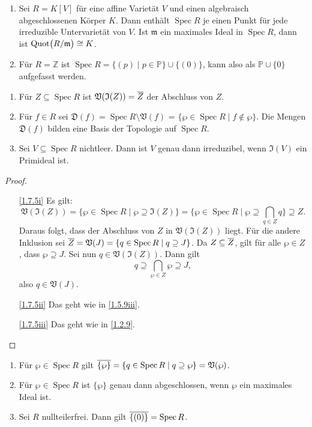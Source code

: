 \documentclass[a4paper,12pt,index=toc]{scrbook}
\theoremstyle{keinenummern} %
\def\V{\mathfrak{V}}
\def\I{\mathfrak{I}}
\def\P{\mathbb{P}}
\newcommand{\D}{\mathfrak{D}}
\def\m{\mathfrak{m}}
\newcommand{\Spec}{\operatorname{Spec}}
\newcommand{\Quot}{\operatorname{Quot}}
\newcommand{\set}[1]{\ensuremath{\mathbb{#1}}}
\newcommand{\Z}{\set{Z}}
\def\Bar#1{\ensuremath\overline{#1}}
\begin{document}
\begin{bsp}\label{1.7.4}
  \begin{enumerate}
  \item{} Sei $R=K[V]$ für eine affine Varietät $V$ und einen algebraisch abgeschlossenen Körper $K$. Dann enthält
    $\Spec R$ je einen Punkt für jede irreduzible Untervarietät von $V$. Ist $\m$ ein maximales Ideal in $\Spec R$, dann ist
    $\Quot\bigl(\Quotient{R}{\m}\bigr)\cong K$.
  \item{} Für $R=\Z$ ist $\Spec R = \{(p)\mid p\in\P\}\cup\{(0)\}$, kann also als $\P\cup\{0\}$ aufgefasst werden.
  \end{enumerate}
\end{bsp}

\begin{bem}\label{1.7.5}
  \begin{enumerate}
  \item{} Für $Z\subseteq\Spec R$ ist $\V(\I(Z))=\Bar{Z}$ der Abschluss von $Z$.
  \item{} Für $f\in R$ sei $\D(f)=\Spec R\setminus\V(f)$ = $\{\wp\in\Spec R\mid f\notin \wp\}$. Die Mengen $\D(f)$
    bilden eine Basis der Topologie auf $\Spec R$.
  \item{} Sei $V\subseteq\Spec R$ nichtleer. Dann ist $V$ genau dann irreduzibel, wenn $\I(V)$ ein Primideal ist.
  \end{enumerate}
\end{bem}
\begin{proof}
  \begin{enumerate}
  \item[\ref{1.7.5i}] Es gilt:\vspace*{-6pt}
  \[\V(\I(Z))=\{\wp\in\Spec R\mid \wp\supseteq\I(Z)\} = \{\wp\in\Spec R\mid \wp\supseteq\bigcap_{q\in Z}q\}\supseteq Z.\]
    Daraus folgt, dass der Abschluss von $Z$ in $\V(\I(Z))$ liegt. Für die andere Inklusion sei
    $\Bar{Z}=\V(J)=\{q\in\Spec R\mid q\supseteq J\}$. Da $Z\subseteq\Bar{Z}$, gilt für alle $\wp\in Z$, dass $\wp\supseteq J$. Sei
    nun $q\in\V(\I(Z))$. Dann gilt \[q\supseteq\bigcap_{\wp\in Z}\wp\supseteq J,\] also $q\in\V(J)$.
  \item[\ref{1.7.5ii}] Das geht wie in \cref{1.5.9iii}.
  \item[\ref{1.7.5iii}] Das geht wie in \cref{1.2.9}.
  \end{enumerate}
\end{proof}

\begin{bem}\label{1.7.6}
  \begin{enumerate}
  \item{} Für $\wp\in\Spec R$ gilt $\Bar{\{\wp\}}=\{q\in\Spec R\mid q\supseteq \wp\}=\V(\wp)$.
  \item{} Für $\wp\in\Spec R$ ist $\{\wp\}$ genau dann abgeschlossen, wenn $\wp$ ein maximales Ideal ist.
  \item{} Sei $R$ nullteilerfrei. Dann gilt $\Bar{\{(0)\}}=\Spec R$.
  \end{enumerate}
\end{bem}
\end{document}
